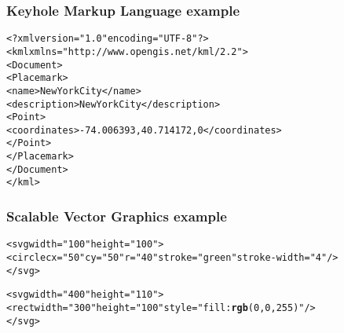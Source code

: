 \documentclass[12pt]{beamer}\usepackage[]{graphicx}\usepackage[]{color}
\makeatletter
\newcommand{\hlstr}[1]{\textcolor[rgb]{0.192,0.494,0.8}{#1}}%
\newcommand{\hlkwd}[1]{\textcolor[rgb]{0.737,0.353,0.396}{\textbf{#1}}}%
\newenvironment{kframe}{%
 \def\at@end@of@kframe{}%
 \ifinner\ifhmode%
  \def\at@end@of@kframe{\end{minipage}}%
  \begin{minipage}{\columnwidth}%
 \fi\fi%
 \def\FrameCommand##1{\hskip\@totalleftmargin \hskip-\fboxsep
 \colorbox{shadecolor}{##1}\hskip-\fboxsep
     \hskip-\linewidth \hskip-\@totalleftmargin \hskip\columnwidth}%
 \MakeFramed {\advance\hsize-\width
   \@totalleftmargin\z@ \linewidth\hsize
   \@setminipage}}%
 {\par\unskip\endMakeFramed%
 \at@end@of@kframe}
\newenvironment{knitrout}{}{} %
\makeatother
\begin{document}

\begin{frame}[fragile]
\frametitle{Keyhole Markup Language example}

\begin{knitrout}\footnotesize
{}\color{fgcolor}\begin{kframe}
\begin{alltt}
<?xml version=\hlstr{"1.0"} encoding=\hlstr{"UTF-8"}?>
<kml xmlns=\hlstr{"http://www.opengis.net/kml/2.2"}>
<Document>
<Placemark>
  <name>New York City</name>
  <description>New York City</description>
  <Point>
    <coordinates>-74.006393,40.714172,0</coordinates>
  </Point>
</Placemark>
</Document>
</kml>
\end{alltt}
\end{kframe}
\end{knitrout}

\end{frame}


\begin{frame}[fragile]
\frametitle{Scalable Vector Graphics example}

\begin{knitrout}\scriptsize
{}\color{fgcolor}\begin{kframe}
\begin{alltt}
<svg width=\hlstr{"100"} height=\hlstr{"100"}>
  <circle cx=\hlstr{"50"} cy=\hlstr{"50"} r=\hlstr{"40"} stroke=\hlstr{"green"} stroke-width=\hlstr{"4"} />
</svg>
  
  
<svg width=\hlstr{"400"} height=\hlstr{"110"}>
  <rect width=\hlstr{"300"} height=\hlstr{"100"} style=\hlstr{"fill:\hlkwd{rgb}(0,0,255)"} />
</svg>
\end{alltt}
\end{kframe}
\end{knitrout}

\end{frame}


\begin{frame}
\begin{center}
\Huge{}
\end{center}
\end{frame}
\end{document}
